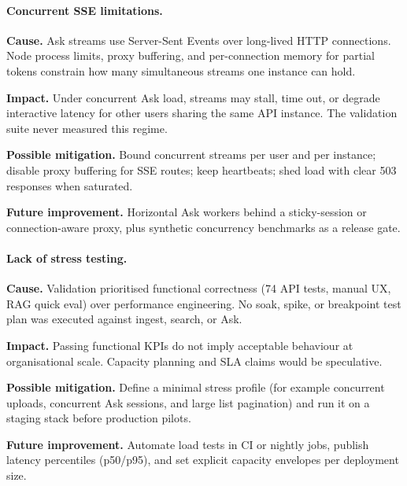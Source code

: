 \paragraph{Concurrent SSE limitations.}
\noindent\textbf{Cause.} Ask streams use Server-Sent Events over long-lived HTTP
connections. Node process limits, proxy buffering, and per-connection memory for
partial tokens constrain how many simultaneous streams one instance can hold.\par\vspace{0.15em}
\noindent\textbf{Impact.} Under concurrent Ask load, streams may stall, time out,
or degrade interactive latency for other users sharing the same API instance.
The validation suite never measured this regime.\par\vspace{0.15em}
\noindent\textbf{Possible mitigation.} Bound concurrent streams per user and per
instance; disable proxy buffering for SSE routes; keep heartbeats; shed load with
clear 503 responses when saturated.\par\vspace{0.15em}
\noindent\textbf{Future improvement.} Horizontal Ask workers behind a
sticky-session or connection-aware proxy, plus synthetic concurrency benchmarks
as a release gate.
\par\vspace{0.35em}
\paragraph{Lack of stress testing.}
\noindent\textbf{Cause.} Validation prioritised functional correctness (74 API
tests, manual UX, RAG quick eval) over performance engineering. No soak, spike,
or breakpoint test plan was executed against ingest, search, or Ask.\par\vspace{0.15em}
\noindent\textbf{Impact.} Passing functional KPIs do not imply acceptable
behaviour at organisational scale. Capacity planning and SLA claims would be
speculative.\par\vspace{0.15em}
\noindent\textbf{Possible mitigation.} Define a minimal stress profile (for
example concurrent uploads, concurrent Ask sessions, and large list pagination)
and run it on a staging stack before production pilots.\par\vspace{0.15em}
\noindent\textbf{Future improvement.} Automate load tests in CI or nightly jobs,
publish latency percentiles (p50/p95), and set explicit capacity envelopes per
deployment size.
\par\vspace{0.35em}
